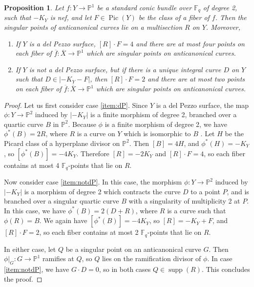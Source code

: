 \documentclass[a4paper, 11pt, reqno]{amsart}
\numberwithin{equation}{section} \numberwithin{figure}{section}
\DeclareMathOperator{\Pic}{Pic}
\DeclareMathOperator{\supp}{supp}
\def \F {{\mathbb F}}
\def \P {{\mathbb P}}
\newcommand{\ra}{\rightarrow}
\newtheorem{proposition}[lemma]{Proposition}
\theoremstyle{definition}
\numberwithin{lemma}{section}
\begin{document}
\begin{proposition}\label{prop:anticanonicalcurvesdP2}
    Let $f \colon Y \ra \P^1$ be a standard conic bundle over $\F_q$ of degree 2, such that $-K_Y$ is nef, and let $F \in \Pic(Y)$ be the class of a fiber of $f$. Then the singular points of anticanonical curves lie on a multisection $R$ on $Y$. Moreover, 
    \begin{enumerate}[label=(\alph*)]
        \item If $Y$ is a del Pezzo surface, $[R] \cdot F = 4$ and there are at most four points on each fiber of $\overline{f} \colon \overline{X} \ra \P^1$ which are singular points on anticanonical curves.\label{item:dP}
        \item If $Y$ is not a del Pezzo surface, but if there is a unique integral curve $D$ on $Y$ such that $D \in |-K_Y - F|$, then $[R] \cdot F = 2$ and there are at most two points on each fiber of $\overline{f} \colon \overline{X} \ra \P^1$ which are singular points on anticanonical curves.\label{item:notdP}
    \end{enumerate}
\end{proposition}

\begin{proof}
         Let us first consider case \ref{item:dP}. Since $Y$ is a del Pezzo surface, the map $\phi \colon Y \ra \P^2$ induced by $|-K_Y|$ is a finite morphism of degree 2, branched over a quartic curve $B$ in $\P^2$. Because $\phi$ is a finite morphism of degree 2, we have $\phi^*(B) = 2R$, where $R$ is a curve on $Y$ which is isomorphic to $B$ \cite[Proposition 4.1.6]{lazarsfeldI}. Let $H$ be the Picard class of a hyperplane divisor on $\P^2$. Then $[B] = 4H$, and $\phi^*(H) = -K_Y$, so $[\phi^*(B)] = -4K_Y$. Therefore $[R] = -2K_Y$ and $[R] \cdot F = 4$, so each fiber contains at most 4 $\F_q$-points that lie on $R$.

         Now consider case \ref{item:notdP}. In this case, the morphism $\phi \colon Y \ra \P^2$ induced by $|-K_Y|$ is a morphism of degree 2 which contracts the curve $D$ to a point $P$, and is branched over a singular quartic curve $B$ with a singularity of multiplicity 2 at $P$. In this case, we have $\phi^*(B) = 2(D + R)$, where $R$ is a curve such that $\phi(R) = B$. We again have $[\phi^*(B)] = -4K_Y$, so $[R] = - K_Y + F$, and $[R] \cdot F = 2$, so each fiber contains at most 2 $\F_q$-points that lie on $R$.

         In either case, let $Q$ be a singular point on an anticanonical curve $G$. Then $\phi|_G \colon G \ra \P^1$ ramifies at $Q$, so $Q$ lies on the ramification divisor of $\phi$. In case \ref{item:notdP}, we have $G \cdot D = 0$, so in both cases $Q \in \supp(R)$. This concludes the proof. 
\end{proof}
\end{document}
